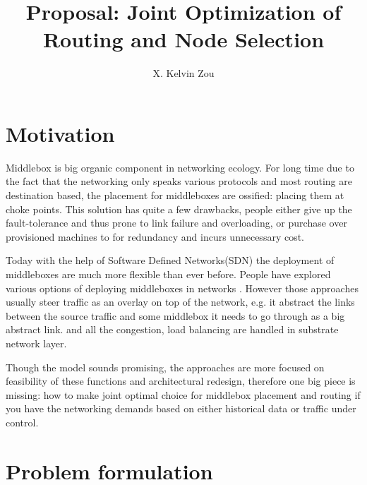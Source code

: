 \documentclass[twoside,leqno, 11pt]{article}
\begin{document}
\title{\Large  Proposal: Joint Optimization of Routing and Node Selection}
\author[]{X. Kelvin Zou}
\date{}

\maketitle


\section{Motivation}

Middlebox is big organic component in networking ecology. For long time due to the fact that the networking only speaks various protocols and most routing are destination based, the placement for middleboxes are ossified: placing them at choke points. This solution has quite a few drawbacks, people either give up the fault-tolerance and thus prone to link failure and overloading, or purchase over provisioned machines to for redundancy and incurs unnecessary cost. 

Today with the help of Software Defined Networks(SDN) the deployment of middleboxes are much more flexible than ever before. People have explored various options of deploying middleboxes in networks \cite{SIMPLE2013, APLOMB2012,ANANTA2013}. However those approaches usually steer traffic as an overlay on top of the network, e.g. it abstract the links between the source traffic and some middlebox it needs to go through as a big abstract link. and all the congestion, load balancing are handled in substrate network layer.

Though the model sounds promising, the approaches are more focused on feasibility of these functions and architectural redesign, therefore one big piece is missing: how to make joint optimal choice for middlebox placement and routing if you have the networking demands based on either historical data or traffic under control.

 \section{Problem formulation} 
 
\end{document}
